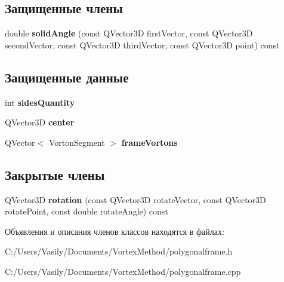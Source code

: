 \subsection*{Защищенные члены}
\begin{DoxyCompactItemize}
\item 
\mbox{\label{class_polygonal_frame_a283672486134ff43feb3462dd984380a}} 
double {\bfseries solid\+Angle} (const Q\+Vector3D first\+Vector, const Q\+Vector3D second\+Vector, const Q\+Vector3D third\+Vector, const Q\+Vector3D point) const
\end{DoxyCompactItemize}
\subsection*{Защищенные данные}
\begin{DoxyCompactItemize}
\item 
\mbox{\label{class_polygonal_frame_ae7e08867613d147250d6ca95f536c270}} 
int {\bfseries sides\+Quantity}
\item 
\mbox{\label{class_polygonal_frame_ab17008e2d246ac723d2e8a98ff907fc8}} 
Q\+Vector3D {\bfseries center}
\item 
\mbox{\label{class_polygonal_frame_a87ed75785bc64d139e65fb486ab079d0}} 
Q\+Vector$<$ Vorton\+Segment $>$ {\bfseries frame\+Vortons}
\end{DoxyCompactItemize}
\subsection*{Закрытые члены}
\begin{DoxyCompactItemize}
\item 
\mbox{\label{class_polygonal_frame_a8e385286c2d59e1f0e4bb9f9110ab6a3}} 
Q\+Vector3D {\bfseries rotation} (const Q\+Vector3D rotate\+Vector, const Q\+Vector3D rotate\+Point, const double rotate\+Angle) const
\end{DoxyCompactItemize}


Объявления и описания членов классов находятся в файлах\+:\begin{DoxyCompactItemize}
\item 
C\+:/\+Users/\+Vasily/\+Documents/\+Vortex\+Method/polygonalframe.\+h\item 
C\+:/\+Users/\+Vasily/\+Documents/\+Vortex\+Method/polygonalframe.\+cpp\end{DoxyCompactItemize}

